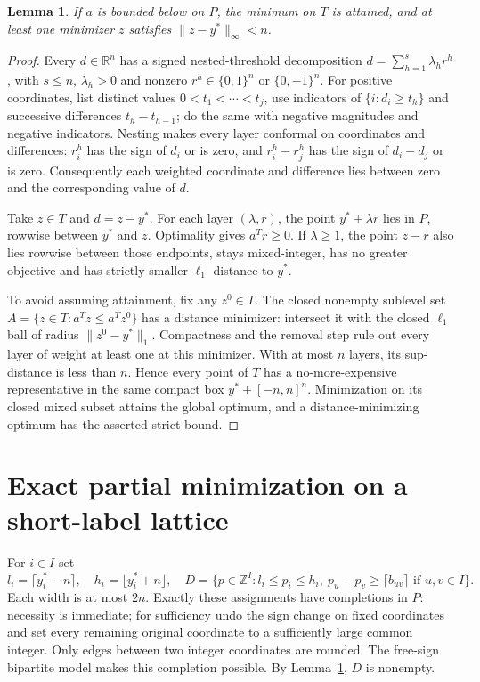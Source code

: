 \documentclass[11pt]{article}
\newtheorem{lemma}[theorem]{Lemma}
\newcommand{\R}{\mathbb R}
\newcommand{\Z}{\mathbb Z}
\begin{document}
\begin{lemma}\label{lem:proximity}
If $a$ is bounded below on $P$, the minimum on $T$ is attained, and at least
one minimizer $z$ satisfies $\|z-y^*\|_\infty<n$.
\end{lemma}
\begin{proof}
Every $d\in\R^n$ has a signed nested-threshold decomposition
$d=\sum_{h=1}^s\lambda_h r^h$, with $s\le n$, $\lambda_h>0$ and nonzero
$r^h\in\{0,1\}^n$ or $\{0,-1\}^n$. For positive coordinates, list distinct
values $0<t_1<\cdots<t_j$, use indicators of $\{i:d_i\ge t_h\}$ and successive
differences $t_h-t_{h-1}$; do the same with negative magnitudes and negative
indicators. Nesting makes every layer conformal on coordinates and differences:
$r_i^h$ has the sign of $d_i$ or is zero, and $r_i^h-r_j^h$ has the sign of
$d_i-d_j$ or is zero. Consequently each weighted coordinate and difference
lies between zero and the corresponding value of $d$.

Take $z\in T$ and $d=z-y^*$. For each layer $(\lambda,r)$, the point
$y^*+\lambda r$ lies in $P$, rowwise between $y^*$ and $z$. Optimality gives
$a^Tr\ge0$. If $\lambda\ge1$, the point $z-r$ also lies rowwise between those
endpoints, stays mixed-integer, has no greater objective and has strictly
smaller $\ell_1$ distance to $y^*$.

To avoid assuming attainment, fix any $z^0\in T$. The closed nonempty sublevel
set $A=\{z\in T:a^Tz\le a^Tz^0\}$ has a distance minimizer: intersect it with
the closed $\ell_1$ ball of radius $\|z^0-y^*\|_1$. Compactness and the removal
step rule out every layer of weight at least one at this minimizer. With at
most $n$ layers, its sup-distance is less than $n$.
Hence every point of $T$ has a no-more-expensive representative in the same
compact box $y^*+[-n,n]^n$. Minimization on its closed mixed subset attains
the global optimum, and a distance-minimizing optimum has the asserted strict
bound.
\end{proof}

\section{Exact partial minimization on a short-label lattice}
For $i\in I$ set
\[
 l_i=\lceil y_i^*-n\rceil,\quad h_i=\lfloor y_i^*+n\rfloor,\quad
 D=\{p\in\Z^I:l_i\le p_i\le h_i,\
 p_u-p_v\ge\lceil b_{uv}\rceil\text{ if }u,v\in I\}.
\]
Each width is at most $2n$. Exactly these assignments have completions in $P$:
necessity is immediate; for sufficiency undo the sign change on fixed
coordinates and set every remaining original coordinate to a sufficiently
large common integer. Only edges between two integer coordinates are rounded.
The free-sign bipartite model makes this completion possible. By
Lemma~\ref{lem:proximity}, $D$ is nonempty.
\end{document}
